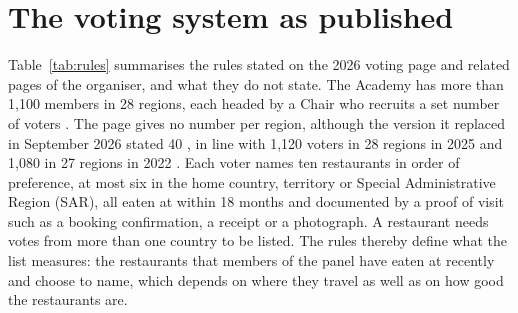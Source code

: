 \documentclass[11pt,a4paper]{article}
\begin{document}
\section{The voting system as published}\label{sec:rules}

Table~\ref{tab:rules} summarises the rules stated on the 2026 voting page and related pages of the organiser, and what they do not state. The Academy has more than 1,100 members in 28 regions, each headed by a Chair who recruits a set number of voters \citep{the50voting2026,the50academy2026}. The page gives no number per region, although the version it replaced in September 2026 stated 40 \citep{w50bvoting2026old}, in line with 1,120 voters in 28 regions in 2025 and 1,080 in 27 regions in 2022 \citep{upcoming2025,thenational2022}. Each voter names ten restaurants in order of preference, at most six in the home country, territory or Special Administrative Region (SAR), all eaten at within 18 months and documented by a proof of visit such as a booking confirmation, a receipt or a photograph. A restaurant needs votes from more than one country to be listed. The rules thereby define what the list measures: the restaurants that members of the panel have eaten at recently and choose to name, which depends on where they travel as well as on how good the restaurants are.
\end{document}
